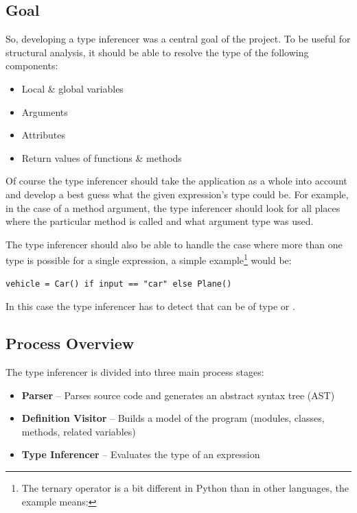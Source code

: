 \documentclass[12pt,halfparskip,DIV11,BCOR10mm]{scrreprt}
\begin{document}
\subsection{Goal}

So, developing a type inferencer was a central goal of the project. To be useful for structural analysis, it should be able to resolve the type of the following components:

\begin{itemize}
    \item Local \& global variables
    \item Arguments
    \item Attributes
    \item Return values of functions \& methods
\end{itemize}

Of course the type inferencer should take the application as a whole into account and develop a best guess what the given expression's type could be. For example, in the case of a method argument, the type inferencer should look for all places where the particular method is called and what argument type was used.

The type inferencer should also be able to handle the case where more than one type is possible for a single expression, a simple example\footnote{The ternary operator is a bit different in Python than in other languages, the example means: } would be:

\begin{lstlisting}
vehicle = Car() if input == "car" else Plane()
\end{lstlisting}

In this case the type inferencer has to detect that  can be of type  or .

\subsection{Process Overview}

The type inferencer is divided into three main process stages:

\begin{itemize}
    \item \textbf{Parser} – Parses source code and generates an abstract syntax tree (AST)
    \item \textbf{Definition Visitor} – Builds a model of the program (modules, classes, methods, related variables)
    \item \textbf{Type Inferencer} – Evaluates the type of an expression
\end{itemize}
\end{document}
